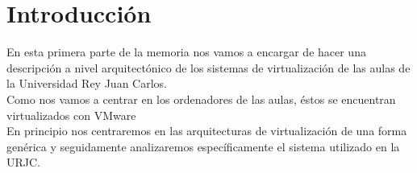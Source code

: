 \chapter{Introducción}
\lettrine[lines=1,slope=4pt,findent=0pt]{E}{}n esta primera parte de la memoria nos vamos a encargar de hacer una descripción a nivel arquitectónico de los sistemas de virtualización de las aulas de la Universidad Rey Juan Carlos.\\

\noindent Como nos vamos a centrar en los ordenadores de las aulas, éstos se encuentran virtualizados con VMware\cite{vmware}\\

\noindent En principio nos centraremos en las arquitecturas de virtualización de una forma genérica y seguidamente analizaremos específicamente el sistema utilizado en la URJC.